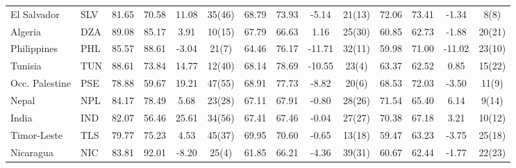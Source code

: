 {\begin{longtable}{m{2.3cm}lcccc|cccc|cccc}
El Salvador                       & SLV           & 81.65            & 70.58              & 11.08            & 35(46)           & 68.79    & 73.93      & -5.14    & 21(13)   & 72.06           & 73.41             & -1.34           & 8(8)            \\
Algeria                           & DZA           & 89.08            & 85.17              & 3.91             & 10(15)           & 67.79    & 66.63      & 1.16     & 25(30)   & 60.85           & 62.73             & -1.88           & 20(21)          \\
Philippines                       & PHL           & 85.57            & 88.61              & -3.04            & 21(7)            & 64.46    & 76.17      & -11.71   & 32(11)   & 59.98           & 71.00             & -11.02          & 23(10)          \\
Tunisia                           & TUN           & 88.61            & 73.84              & 14.77            & 12(40)           & 68.14    & 78.69      & -10.55   & 23(4)    & 63.37           & 62.52             & 0.85            & 15(22)          \\
Occ. Palestine    & PSE           & 78.88            & 59.67              & 19.21            & 47(55)           & 68.91    & 77.73      & -8.82    & 20(6)    & 68.53           & 72.03             & -3.50           & 11(9)           \\
Nepal                             & NPL           & 84.17            & 78.49              & 5.68             & 23(28)           & 67.11    & 67.91      & -0.80    & 28(26)   & 71.54           & 65.40             & 6.14            & 9(14)           \\
India                             & IND           & 82.07            & 56.46              & 25.61            & 34(56)           & 67.41    & 67.46      & -0.04    & 27(27)   & 70.38           & 67.18             & 3.21            & 10(12)          \\
Timor-Leste                       & TLS           & 79.77            & 75.23              & 4.53             & 45(37)           & 69.95    & 70.60      & -0.65    & 13(18)   & 59.47           & 63.23             & -3.75           & 25(18)          \\
Nicaragua                         & NIC           & 83.81            & 92.01              & -8.20            & 25(4)            & 61.85    & 66.21      & -4.36    & 39(31)   & 60.67           & 62.44             & -1.77           & 22(23)          \\

\end{longtable}}
